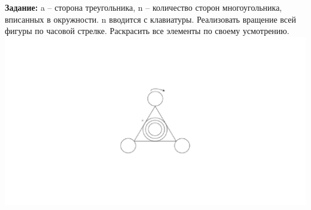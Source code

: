 \textbf{Задание:} a -- сторона треугольника, n -- количество сторон
многоугольника, вписанных в окружности. n вводится с клавиатуры.
Реализовать вращение всей фигуры по часовой стрелке. Раскрасить все
элементы по своему усмотрению. \includegraphics{./files/pic1.png}

